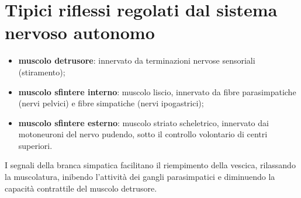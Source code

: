 \section{Tipici riflessi regolati dal sistema nervoso autonomo}

\begin{itemize}
  \item \textbf{muscolo detrusore}: innervato da terminazioni nervose
    sensoriali (stiramento);
  \item \textbf{muscolo sfintere interno}: muscolo liscio, innervato da
    fibre parasimpatiche (nervi pelvici) e fibre simpatiche (nervi
    ipogastrici);
  \item \textbf{muscolo sfintere esterno}: muscolo striato scheletrico,
    innervato dai motoneuroni del nervo pudendo, sotto il controllo
    volontario di centri superiori.
\end{itemize}

I segnali della branca simpatica facilitano il riempimento della vescica,
rilassando la muscolatura, inibendo l'attività dei gangli parasimpatici e
diminuendo la capacità contrattile del muscolo detrusore.

